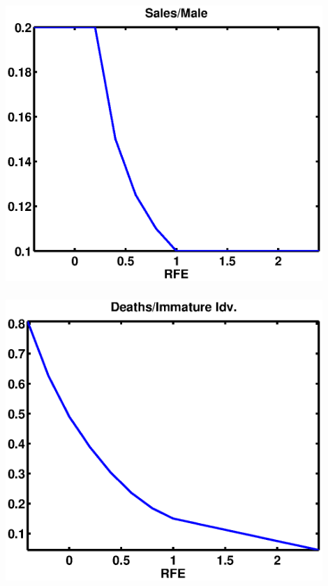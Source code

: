 \documentclass[mathserif]{beamer}
\begin{document}
\begin{frame}
  \begin{center}
    \frametitle{\insertsubsection}
    \includegraphics[width=0.9\textwidth]{salemale}
  \end{center}
\end{frame}

\begin{frame}
  \begin{center}
    \frametitle{\insertsubsection}
    \includegraphics[width=0.9\textwidth]{mortMat}
  \end{center}
\end{frame}
\end{document}
